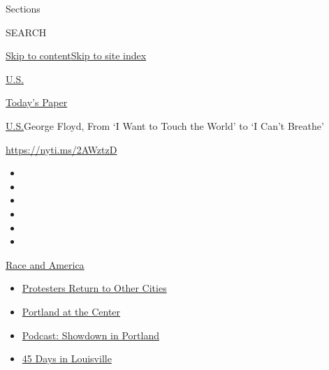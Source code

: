 Sections

SEARCH

\protect\hyperlink{site-content}{Skip to
content}\protect\hyperlink{site-index}{Skip to site index}

\href{https://www.nytimes3xbfgragh.onion/section/us}{U.S.}

\href{https://myaccount.nytimes3xbfgragh.onion/auth/login?response_type=cookie\&client_id=vi}{}

\href{https://www.nytimes3xbfgragh.onion/section/todayspaper}{Today's
Paper}

\href{/section/us}{U.S.}\textbar{}George Floyd, From `I Want to Touch
the World' to `I Can't Breathe'

\url{https://nyti.ms/2AWztzD}

\begin{itemize}
\item
\item
\item
\item
\item
\item
\end{itemize}

\href{https://www.nytimes3xbfgragh.onion/news-event/george-floyd-protests-minneapolis-new-york-los-angeles?action=click\&pgtype=Article\&state=default\&region=TOP_BANNER\&context=storylines_menu}{Race
and America}

\begin{itemize}
\tightlist
\item
  \href{https://www.nytimes3xbfgragh.onion/2020/07/26/us/protests-portland-seattle-trump.html?action=click\&pgtype=Article\&state=default\&region=TOP_BANNER\&context=storylines_menu}{Protesters
  Return to Other Cities}
\item
  \href{https://www.nytimes3xbfgragh.onion/2020/07/24/us/portland-oregon-protests-white-race.html?action=click\&pgtype=Article\&state=default\&region=TOP_BANNER\&context=storylines_menu}{Portland
  at the Center}
\item
  \href{https://www.nytimes3xbfgragh.onion/2020/07/23/podcasts/the-daily/portland-protests.html?action=click\&pgtype=Article\&state=default\&region=TOP_BANNER\&context=storylines_menu}{Podcast:
  Showdown in Portland}
\item
  \href{https://www.nytimes3xbfgragh.onion/interactive/2020/07/16/us/black-lives-matter-protests-louisville-breonna-taylor.html?action=click\&pgtype=Article\&state=default\&region=TOP_BANNER\&context=storylines_menu}{45
  Days in Louisville}
\end{itemize}

